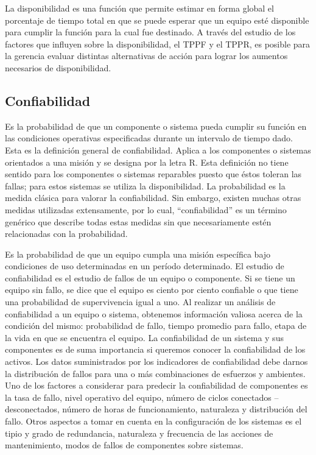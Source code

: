 \documentclass[]{article}
\begin{document}
La disponibilidad es una función que permite estimar en forma global el porcentaje de tiempo total en que se puede esperar que un equipo esté disponible para cumplir la función para la cual fue destinado. A través del estudio de los factores que influyen sobre la disponibilidad, el TPPF y el TPPR, es posible para la gerencia evaluar distintas alternativas de acción para lograr los aumentos necesarios de disponibilidad.\cite{amendola2003indicadores}

\subsection{Confiabilidad}


Es la probabilidad de que un componente o sistema pueda cumplir su función en las condiciones operativas especificadas durante un intervalo de tiempo dado. Esta es la definición general de confiabilidad. Aplica a los componentes o sistemas orientados a una misión y se designa por la letra R. Esta definición no tiene sentido para los componentes o sistemas reparables puesto que éstos toleran las fallas; para estos sistemas se utiliza la disponibilidad.
La probabilidad es la medida clásica para valorar la confiabilidad. Sin embargo, existen muchas otras medidas utilizadas extensamente, por lo cual, “confiabilidad” es un término genérico que describe todas estas medidas sin que necesariamente estén relacionadas con la probabilidad.\cite{rios2014iso}

Es la probabilidad de que un equipo cumpla una misión específica bajo condiciones de uso determinadas en un período determinado. El estudio de confiabilidad es el estudio de fallos de un equipo o componente. Si se tiene un equipo sin fallo, se dice que el equipo es ciento por ciento confiable o que tiene una probabilidad de supervivencia igual a uno. Al realizar un análisis de confiabilidad a un equipo o sistema, obtenemos información valiosa acerca de la condición del mismo: probabilidad de fallo, tiempo promedio para fallo, etapa de la vida en que se encuentra el equipo.
La confiabilidad de un sistema y sus componentes es de suma importancia si queremos conocer la confiabilidad de los activos. Los datos suministrados por los indicadores de confiabilidad debe darnos la distribución de fallos para una o más combinaciones de esfuerzos y ambientes. Uno de los factores a considerar para predecir la confiabilidad de componentes es la tasa de fallo, nivel operativo del equipo, número de ciclos conectados – desconectados, número de horas de funcionamiento, naturaleza y distribución del fallo. Otros aspectos a tomar en cuenta en la configuración de los sistemas es el tipio y grado de redundancia, naturaleza y frecuencia de las acciones de mantenimiento, modos de fallos de componentes sobre sistemas.\cite{zapata2011confiabilidad}
\end{document}
